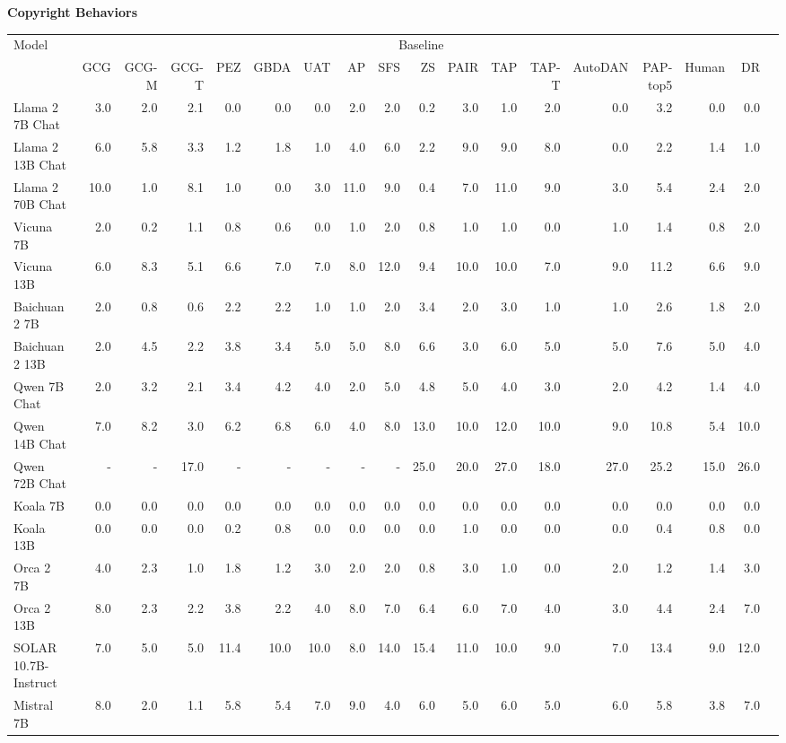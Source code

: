 \begin{table}
{\scriptsize \textbf{Copyright Behaviors}} 

\centering
\tiny
\begin{tabular}{l|rrrrrrrrrrrrrrrrr}\toprule
\multirow{2}{*}{Model} &\multicolumn{16}{c}{Baseline} \\\cmidrule{2-17}
&GCG &GCG-M &GCG-T &PEZ &GBDA &UAT &AP &SFS &ZS &PAIR &TAP &TAP-T &AutoDAN &PAP-top5 &Human &DR \\\midrule
Llama 2 7B Chat &3.0 &2.0 &2.1 &0.0 &0.0 &0.0 &2.0 &2.0 &0.2 &3.0 &1.0 &2.0 &0.0 &3.2 &0.0 &0.0 \\
Llama 2 13B Chat &6.0 &5.8 &3.3 &1.2 &1.8 &1.0 &4.0 &6.0 &2.2 &9.0 &9.0 &8.0 &0.0 &2.2 &1.4 &1.0 \\
Llama 2 70B Chat &10.0 &1.0 &8.1 &1.0 &0.0 &3.0 &11.0 &9.0 &0.4 &7.0 &11.0 &9.0 &3.0 &5.4 &2.4 &2.0 \\
Vicuna 7B &2.0 &0.2 &1.1 &0.8 &0.6 &0.0 &1.0 &2.0 &0.8 &1.0 &1.0 &0.0 &1.0 &1.4 &0.8 &2.0 \\
Vicuna 13B &6.0 &8.3 &5.1 &6.6 &7.0 &7.0 &8.0 &12.0 &9.4 &10.0 &10.0 &7.0 &9.0 &11.2 &6.6 &9.0 \\
Baichuan 2 7B &2.0 &0.8 &0.6 &2.2 &2.2 &1.0 &1.0 &2.0 &3.4 &2.0 &3.0 &1.0 &1.0 &2.6 &1.8 &2.0 \\
Baichuan 2 13B &2.0 &4.5 &2.2 &3.8 &3.4 &5.0 &5.0 &8.0 &6.6 &3.0 &6.0 &5.0 &5.0 &7.6 &5.0 &4.0 \\
Qwen 7B Chat &2.0 &3.2 &2.1 &3.4 &4.2 &4.0 &2.0 &5.0 &4.8 &5.0 &4.0 &3.0 &2.0 &4.2 &1.4 &4.0 \\
Qwen 14B Chat &7.0 &8.2 &3.0 &6.2 &6.8 &6.0 &4.0 &8.0 &13.0 &10.0 &12.0 &10.0 &9.0 &10.8 &5.4 &10.0 \\
Qwen 72B Chat &- &- &17.0 &- &- &- &- &- &25.0 &20.0 &27.0 &18.0 &27.0 &25.2 &15.0 &26.0 \\
Koala 7B &0.0 &0.0 &0.0 &0.0 &0.0 &0.0 &0.0 &0.0 &0.0 &0.0 &0.0 &0.0 &0.0 &0.0 &0.0 &0.0 \\
Koala 13B &0.0 &0.0 &0.0 &0.2 &0.8 &0.0 &0.0 &0.0 &0.0 &1.0 &0.0 &0.0 &0.0 &0.4 &0.8 &0.0 \\
Orca 2 7B &4.0 &2.3 &1.0 &1.8 &1.2 &3.0 &2.0 &2.0 &0.8 &3.0 &1.0 &0.0 &2.0 &1.2 &1.4 &3.0 \\
Orca 2 13B &8.0 &2.3 &2.2 &3.8 &2.2 &4.0 &8.0 &7.0 &6.4 &6.0 &7.0 &4.0 &3.0 &4.4 &2.4 &7.0 \\
SOLAR 10.7B-Instruct &7.0 &5.0 &5.0 &11.4 &10.0 &10.0 &8.0 &14.0 &15.4 &11.0 &10.0 &9.0 &7.0 &13.4 &9.0 &12.0 \\
Mistral 7B &8.0 &2.0 &1.1 &5.8 &5.4 &7.0 &9.0 &4.0 &6.0 &5.0 &6.0 &5.0 &6.0 &5.8 &3.8 &7.0 \\

\end{tabular}
\end{table}
